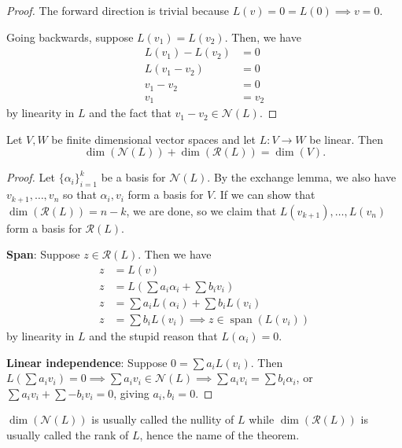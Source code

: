 \begin{proof}
The forward direction is trivial because $L(v) = 0 = L(0) \implies v =
0$.

Going backwards, suppose $L(v_1) = L(v_2)$. Then, we have
\[ \begin{aligned}
L(v_1) - L(v_2) &= 0 \\
L(v_1 - v_2) &= 0 \\
v_1 - v_2 &= 0 \\
v_1 &= v_2
\end{aligned} \]
by linearity in $L$ and the fact that $v_1 - v_2 \in \mathcal{N}(L)$.
\end{proof}

\begin{thm}
Let $V, W$ be finite dimensional vector spaces and let $L : V
\rightarrow W$ be linear. Then
\[ \dim(\mathcal{N}(L)) + \dim(\mathcal{R}(L)) = \dim(V). \]
\end{thm}

\begin{proof}
Let $\lbrace \alpha_i \rbrace_{i = 1}^{k}$ be a basis for
$\mathcal{N}(L)$. By the exchange lemma, we also have $v_{k + 1}, \dots,
v_n$ so that $\alpha_i, v_i$ form a basis for $V$. If we can show that
$\dim(\mathcal{R}(L)) = n - k$, we are done, so we claim that $L(v_{k +
1}), \dots, L(v_n)$ form a basis for $\mathcal{R}(L)$.

\textbf{Span}: Suppose $z \in \mathcal{R}(L)$. Then we have
\[ \begin{aligned}
z &= L(v) \\
z &= L\left(\sum a_i \alpha_i + \sum b_i v_i\right) \\
z &= \sum a_i L(\alpha_i) + \sum b_i L(v_i) \\
z &= \sum b_i L(v_i) \implies z \in \operatorname{span}(L(v_i))
\end{aligned} \]
by linearity in $L$ and the stupid reason that $L(\alpha_i) = 0$.

\textbf{Linear independence}: Suppose $0 = \sum a_i L(v_i)$. Then
$L\left(\sum a_i v_i\right) = 0 \implies \sum a_i v_i \in \mathcal{N}(L)
\implies \sum a_i v_i = \sum b_i \alpha_i$, or $\sum a_i v_i + \sum -b_i
v_i = 0$, giving $a_i, b_i = 0$.
\end{proof}

\begin{rem}
$\dim(\mathcal{N}(L))$ is usually called the nullity of $L$ while
$\dim(\mathcal{R}(L))$ is usually called the rank of $L$, hence the name
of the theorem.
\end{rem}

